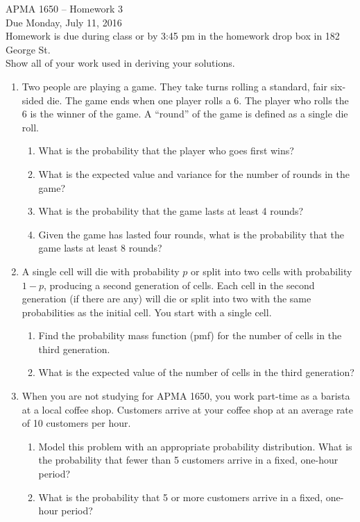 \documentclass[12pt]{article}
\begin{document}
\title{}
\author{\vspace{-10ex} }

\begin{center}
{\LARGE APMA 1650 -- Homework 3}\\
\vspace{5mm}
{\large Due Monday, July 11, 2016}\\
\vspace{5mm}
Homework is due during class or by 3:45 pm in the homework drop box in 182 George St.\\
Show all of your work used in deriving your solutions.
\end{center}

\begin{enumerate}

\item Two people are playing a game. They take turns rolling a standard, fair six-sided die. The game ends when one player rolls a 6. The player who rolls the 6 is the winner of the game. A ``round'' of the game is defined as a single die roll.
\begin{enumerate}
\item What is the probability that the player who goes first wins?
\item What is the expected value and variance for the number of rounds in the game?
\item What is the probability that the game lasts at least 4 rounds?
\item Given the game has lasted four rounds, what is the probability that the game lasts at least 8 rounds?
\end{enumerate}

\item A single cell will die with probability $p$ or split into two cells with probability $1 - p$, producing a second generation of cells. Each cell in the second generation (if there are any) will die or split into two with the same probabilities as the initial cell. You start with a single cell.
\begin{enumerate}
\item Find the probability mass function (pmf) for the number of cells in the third generation.
\item What is the expected value of the number of cells in the third generation?
\end{enumerate}

\item When you are not studying for APMA 1650, you work part-time as a barista at a local coffee shop. Customers arrive at your coffee shop at an average rate of 10 customers per hour.
\begin{enumerate}
\item Model this problem with an appropriate probability distribution. What is the probability that fewer than 5 customers arrive in a fixed, one-hour period?
\item What is the probability that 5 or more customers arrive in a fixed, one-hour period?\\


\end{enumerate}
\end{enumerate}
\end{document}
